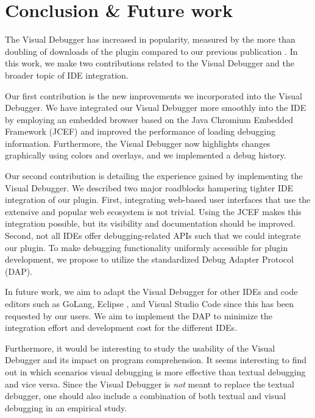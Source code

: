 \documentclass[sigconf]{acmart}
\begin{document}
\section{Conclusion \& Future work} \label{sec:conclusion}
The Visual Debugger has increased in popularity, measured by the more than doubling of downloads of the plugin compared to our previous publication \cite{krauterVisualDebuggerTool2022}.
In this work, we make two contributions related to the Visual Debugger and the broader topic of IDE integration.

Our first contribution is the new improvements we incorporated into the Visual Debugger.
We have integrated our Visual Debugger more smoothly into the IDE by employing an embedded browser based on the Java Chromium Embedded Framework (JCEF) and improved the performance of loading debugging information.
Furthermore, the Visual Debugger now highlights changes graphically using colors and overlays, and we implemented a debug history.

Our second contribution is detailing the experience gained by implementing the Visual Debugger.
We described two major roadblocks hampering tighter IDE integration of our plugin.
First, integrating web-based user interfaces that use the extensive and popular web ecosystem is not trivial.
Using the JCEF makes this integration possible, but its visibility and documentation should be improved.
Second, not all IDEs offer debugging-related APIs such that we could integrate our plugin.
To make debugging functionality uniformly accessible for plugin development, we propose to utilize the standardized Debug Adapter Protocol (DAP).

In future work, we aim to adapt the Visual Debugger for other IDEs and code editors such as GoLang, Eclipse \cite{desrivieresEclipsePlatformIntegrating2004}, and Visual Studio Code since this has been requested by our users.
We aim to implement the DAP to minimize the integration effort and development cost for the different IDEs.

Furthermore, it would be interesting to study the usability of the Visual Debugger and its impact on program comprehension.
It seems interesting to find out in which scenarios visual debugging is more effective than textual debugging and vice versa.
Since the Visual Debugger is \textit{not} meant to replace the textual debugger, one should also include a combination of both textual and visual debugging in an empirical study.


\renewcommand\UrlFont{\color{black}}



\end{document}
